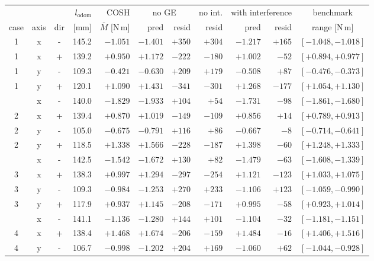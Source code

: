 \documentclass[10pt]{article}
\begin{document}
\begin{table}[t]
\centering
\footnotesize
\setlength{\tabcolsep}{3.4pt}
\begin{tabular}{ccc r r rr r rr c}
\toprule
 & & & $l_{\mathrm{odom}}$ & COSH & \multicolumn{2}{c}{no GE} &
no int. & \multicolumn{2}{c}{with interference} & benchmark \\
\cmidrule(lr){6-7} \cmidrule(lr){9-10}
case & axis & dir & [mm] & $\bar M$ [N\,m] & pred & resid &
resid & pred & resid & range [N\,m] \\
\midrule
1 & x & - & 145.2 & $-1.051$ & $-1.401$ & $+350$ & $+304$ & $-1.217$ & $+165$ & $[-1.048, -1.018]$ \\
1 & x & + & 139.2 & $+0.950$ & $+1.172$ & $-222$ & $-180$ & $+1.002$ & $-52$ & $[+0.894, +0.977]$ \\
1 & y & - & 109.3 & $-0.421$ & $-0.630$ & $+209$ & $+179$ & $-0.508$ & $+87$ & $[-0.476, -0.373]$ \\
1 & y & + & 120.1 & $+1.090$ & $+1.431$ & $-341$ & $-301$ & $+1.268$ & $-177$ & $[+1.054, +1.130]$ \\
\addlinespace[2pt]
2 & x & - & 140.0 & $-1.829$ & $-1.933$ & $+104$ & $+54$ & $-1.731$ & $-98$ & $[-1.861, -1.680]$ \\
2 & x & + & 139.4 & $+0.870$ & $+1.019$ & $-149$ & $-109$ & $+0.856$ & $+14$ & $[+0.789, +0.913]$ \\
2 & y & - & 105.0 & $-0.675$ & $-0.791$ & $+116$ & $+86$ & $-0.667$ & $-8$ & $[-0.714, -0.641]$ \\
2 & y & + & 118.5 & $+1.338$ & $+1.566$ & $-228$ & $-187$ & $+1.398$ & $-60$ & $[+1.248, +1.333]$ \\
\addlinespace[2pt]
3 & x & - & 142.5 & $-1.542$ & $-1.672$ & $+130$ & $+82$ & $-1.479$ & $-63$ & $[-1.608, -1.339]$ \\
3 & x & + & 138.3 & $+0.997$ & $+1.294$ & $-297$ & $-254$ & $+1.121$ & $-123$ & $[+1.033, +1.075]$ \\
3 & y & - & 109.3 & $-0.984$ & $-1.253$ & $+270$ & $+233$ & $-1.106$ & $+123$ & $[-1.059, -0.990]$ \\
3 & y & + & 117.9 & $+0.937$ & $+1.145$ & $-208$ & $-171$ & $+0.995$ & $-58$ & $[+0.923, +1.014]$ \\
\addlinespace[2pt]
4 & x & - & 141.1 & $-1.136$ & $-1.280$ & $+144$ & $+101$ & $-1.104$ & $-32$ & $[-1.181, -1.151]$ \\
4 & x & + & 138.4 & $+1.468$ & $+1.674$ & $-206$ & $-159$ & $+1.484$ & $-16$ & $[+1.406, +1.516]$ \\
4 & y & - & 106.7 & $-0.998$ & $-1.202$ & $+204$ & $+169$ & $-1.060$ & $+62$ & $[-1.044, -0.928]$ \\

\end{tabular}
\end{table}
\end{document}
